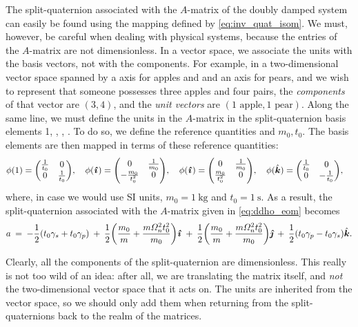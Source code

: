 The split-quaternion associated with the \(A\)-matrix of the doubly damped system can easily be found using the mapping defined by \cref{eq:inv_quat_isom}. We must, however, be careful when dealing with physical systems, because the entries of the \(A\)-matrix are not dimensionless. In a vector space, we associate the units with the basis vectors, not with the components. For example, in a two-dimensional vector space spanned by a axis for apples and and an axis for pears, and we wish to represent that someone possesses three apples and four pairs, the \emph{components} of that vector are \((3, 4)\), and the \emph{unit vectors} are \((1 \text{ apple}, 1\text{ pear})\). Along the same line, we must define the units in the \(A\)-matrix in the split-quaternion basis elements 1, \quati, \quatj, \quatk. To do so, we define the reference quantities and \(m_0, t_0\). The basis elements are then mapped in terms of these reference quantities:
\begin{equation}
     \phi(1) = \mqty(\tfrac{1}{t_0} & 0 \\ 0 & \tfrac{1}{t_0}), \quad 
    \phi(\quati) = \mqty(0 & \tfrac{1}{m_0} \\  -\tfrac{m_0}{t_0^2} & 0), \quad
    \phi(\quati) = \mqty(0 & \tfrac{1}{m_0} \\  \tfrac{m_0}{t_0^2} & 0), \quad
    \phi(\quatk) = \mqty(\tfrac{1}{t_0} & 0 \\ 0 & -\tfrac{1}{t_0}), \quad
\end{equation}
where, in case we would use SI units, \(m_0 = \SI{1}{\kilogram}\) and \(t_0 = \SI{1}{\second}\). As a result, the split-quaternion associated with the \(A\)-matrix given in \cref{eq:ddho_eom} becomes
\begin{equation}
    a\:=\: -\frac{1}{2}\qty(t_0\gamma_s + t_0\gamma_p)\:+\:\frac{1}{2}\qty(\frac{m_0}{m} + \frac{m\Omega_n^2 t_0^2}{m_0})\quati\:+\:\frac{1}{2}\qty(\frac{m_0}{m} + \frac{m\Omega_n^2 t_0^2}{m_0})\quatj\:+\:\frac{1}{2}\qty(t_0\gamma_p - t_0\gamma_s)\quatk. 
    \label{eq:ddho_quat_units}
\end{equation}

Clearly, all the components of the split-quaternion are dimensionless. This really is not too wild of an idea: after all, we are translating the matrix itself, and \emph{not} the two-dimensional vector space that it acts on. The units are inherited from the vector space, so we should only add them when returning from the split-quaternions back to the realm of the matrices. 

